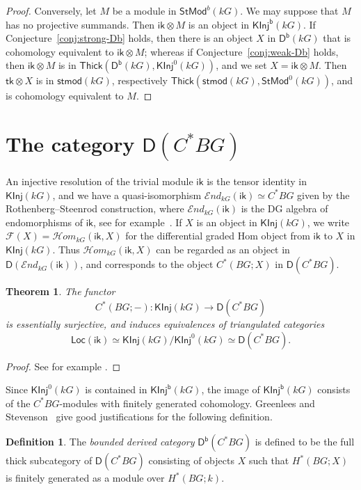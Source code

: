 \documentclass[12pt]{amsart}
\newcommand{\DD}{\mathsf{D}}%
\newcommand{\Db}{\DD^{\mathsf{b}}}%
\newcommand{\iEnd}{\mathcal{E}\mathit{nd}}%
\newcommand{\iHom}{\mathcal{H}\mathit{om}}%
\newcommand{\ik}{\mathsf{ik}}
\newcommand{\kG}{\kk G}
\newcommand{\kk}{k}
\newcommand{\KInj}{\mathsf{KInj}}
\newcommand{\KInjb}{\KInj^{\mathsf{b}}}
\newcommand{\Loc}{\mathsf{Loc}}
\newcommand{\stmod}{\mathsf{stmod}}
\newcommand{\StMod}{\mathsf{StMod}}
\newcommand{\Thick}{\mathsf{Thick}}
\newcommand{\tk}{\mathsf{tk}}
\newcommand{\cF}{\mathcal F}
\numberwithin{equation}{section}
\theoremstyle{plain}
\newtheorem{theorem}[equation]{Theorem}
\theoremstyle{definition}
\newtheorem{definition}[equation]{Definition}
\theoremstyle{remark}
\begin{document}
\begin{proof}
Conversely, 
let $M$ be a module in $\StMod^b(\kG)$. We may suppose that $M$ has no
projective summands. Then $\ik \otimes M$ is an
object in $\KInjb(\kG)$. If Conjecture~\ref{conj:strong-Db} holds,
then 
there is an object $X$ in $\Db(\kG)$
that is cohomology equivalent to $\ik\otimes M$; whereas if
Conjecture~\ref{conj:weak-Db} holds, then $\ik\otimes M$ is in
$\Thick(\Db(\kG),\KInj^0(\kG))$, and we set $X=\ik\otimes M$.
Then $\tk\otimes X$
is in $\stmod(\kG)$, respectively $\Thick(\stmod(\kG),\StMod^0(\kG))$, 
and is cohomology equivalent to $M$.
\end{proof}

\section{\texorpdfstring{The category $\DD(C^*BG)$}{The category D(C*BG)}}

An injective resolution of the trivial module 
$\ik$ is the tensor identity in $\KInj(\kG)$, and we
have a quasi-isomorphism $\iEnd_{\kG}(\ik)\simeq C^*BG$ given by the
Rothenberg--Steenrod construction, where
$\iEnd_{\kG}(\ik)$ is the DG algebra of endomorphisms of $\ik$,
see for example~\cite[\S4]{Benson/Krause:2008a}.
If $X$ is an object in $\KInj(\kG)$, we write 
$\cF(X)=\iHom_{\kG}(\ik,X)$ for the differential graded Hom object from $\ik$ to $X$ in
$\KInj(\kG)$. 
Thus $\iHom_{\kG}(\ik,X)$ can be regarded as an object in
$\DD(\iEnd_{\kG}(\ik))$, and corresponds to the object $C^*(BG;X)$ in 
$\DD(C^*BG)$.

\begin{theorem}\label{th:DC*BG}
The functor 
\[ C^*(BG;-) \colon \KInj(\kG) \to \DD(C^*BG) \]
is essentially surjective, and induces equivalences of triangulated
categories  
\[ \Loc(\ik)\simeq\KInj(\kG)/\KInj^0(\kG)\simeq \DD(C^*BG). \] 
\end{theorem}
\begin{proof}
See for example \cite{Benson/Krause:2008a}.
\end{proof}


Since $\KInj^0(\kG)$ is contained in $\KInjb(\kG)$, 
the image of $\KInjb(\kG)$ consists of the $C^*BG$-modules with
finitely generated cohomology. Greenlees and
Stevenson~\cite{Greenlees/Stevenson:2020a} give good justifications for
the following definition.

\begin{definition}
The \emph{bounded derived category} $\Db(C^*BG)$ is defined to be the
full thick subcategory of $\DD(C^*BG)$ consisting of objects $X$ such
that $H^*(BG;X)$ is finitely generated as a module over $H^*(BG;\kk)$.
\end{definition}
\end{document}
